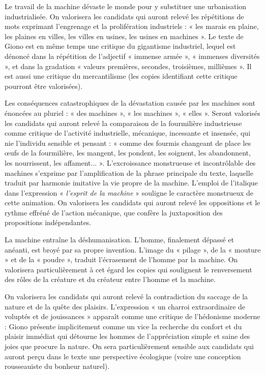{Le travail de la machine dévaste le monde pour y substituer une urbanisation
industrialisée. On valorisera les candidats qui auront relevé les répétitions de mots
exprimant l’engrenage et la prolifération industriels : « les marais en plaine, les plaines
en villes, les villes en usines, les usines en machines ». Le texte de Giono est en même
temps une critique du gigantisme industriel, lequel est dénoncé dans la répétition de
l’adjectif « immense armée », « immenses diversités », et dans la gradation « valeurs
premières, secondes, troisièmes, millièmes ». Il est aussi une critique du
mercantilisme (les copies identifiant cette critique pourront être valorisées).

Les conséquences catastrophiques de la dévastation causée par les machines sont
énoncées au pluriel : « des machines », « les machines », « elles ». Seront valorisés
les candidats qui auront relevé la comparaison de la fourmilière industrieuse comme
critique de l’activité industrielle, mécanique, incessante et insensée, qui nie l’individu
sensible et pensant : « comme des fourmis changeant de place les œufs de la
fourmilière, les mangent, les pondent, les soignent, les abandonnent, les nourrissent,
les affament... ». L’excroissance monstrueuse et incontrôlable des machines
s’exprime par l’amplification de la phrase principale du texte, laquelle traduit par
harmonie imitative la vie propre de la machine. L’emploi de l’italique dans l’expression
« \emph{l’esprit de la machine} » souligne le caractère monstrueux de cette animation. On
valorisera les candidats qui auront relevé les oppositions et le rythme effréné de
l’action mécanique, que confère la juxtaposition des propositions indépendantes.

La machine entraîne la déshumanisation. L’homme, finalement dépassé et anéanti,
est broyé par sa propre invention. L’image du « pilage », de la « mouture » et de la
« poudre », traduit l’écrasement de l’homme par la machine. On valorisera
particulièrement à cet égard les copies qui soulignent le renversement des rôles de la
créature et du créateur entre l’homme et la machine.

On valorisera les candidats qui auront relevé la contradiction du saccage de la nature
et de la quête des plaisirs. L’expression « un charroi extraordinaire de voluptés et de
jouissances » apparaît comme une critique de l’hédonisme moderne : Giono présente
implicitement comme un vice la recherche du confort et du plaisir immédiat qui
détourne les hommes de l’appréciation simple et saine des joies que procure la nature.
On sera particulièrement sensible aux candidats qui auront perçu dans le texte une
perspective écologique (voire une conception rousseauiste du bonheur naturel).

}
